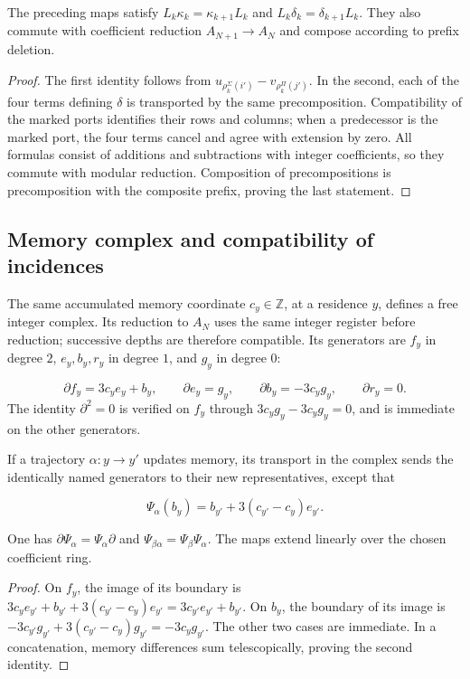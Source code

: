 \begin{proposition}
\label{iv:rectangular-natural}
The preceding maps satisfy
\(L_k\kappa_k=\kappa_{k+1}L_k\) and
\(L_k\delta_k=\delta_{k+1}L_k\).
They also commute with coefficient reduction
\(A_{N+1}\to A_N\) and compose according to prefix deletion.
\end{proposition}
\begin{proof}
The first identity follows from
\(u_{\rho_k^\Sigma(i')}-v_{\rho_k^\Pi(j')}\).
In the second, each of the four terms defining \(\delta\)
is transported by the same precomposition. Compatibility of the
marked ports identifies their rows and columns; when a predecessor is
the marked port, the four terms cancel and agree with
extension by zero. All formulas consist of additions and subtractions with
integer coefficients, so they commute with modular reduction.
Composition of precompositions is precomposition with the
composite prefix, proving the last statement.
\end{proof}

\subsection{Memory complex and compatibility of incidences}
\label{iv:cont:memoria}
The same accumulated memory coordinate \(c_y\in\mathbb Z\), at a residence \(y\), defines a free integer complex. Its reduction to \(A_N\) uses the same integer register before reduction; successive depths are therefore compatible. Its generators are \(f_y\) in degree \(2\), \(e_y,b_y,r_y\) in degree \(1\), and \(g_y\) in degree \(0\):

\[
\partial f_y=3c_y e_y+b_y,\qquad
\partial e_y=g_y,\qquad
\partial b_y=-3c_y g_y,\qquad
\partial r_y=0.
\]
The identity \(\partial^2=0\) is verified on \(f_y\) through \(3c_yg_y-3c_yg_y=0\), and is immediate on the other generators.

If a trajectory \(\alpha:y\to y'\) updates memory, its transport in the complex sends the identically named generators to their new representatives, except that

\[
\Psi_\alpha(b_y)=b_{y'}+3(c_{y'}-c_y)e_{y'}.
\]
\begin{proposition}
\label{iv:cont:memoria-natural}
One has \(\partial\Psi_\alpha=\Psi_\alpha\partial\) and \(\Psi_{\beta\alpha}=\Psi_\beta\Psi_\alpha\). The maps extend linearly over the chosen coefficient ring.

\end{proposition}
\begin{proof}
On \(f_y\), the image of its boundary is \(3c_ye_{y'}+b_{y'}+3(c_{y'}-c_y)e_{y'} =3c_{y'}e_{y'}+b_{y'}\). On \(b_y\), the boundary of its image is \(-3c_{y'}g_{y'}+3(c_{y'}-c_y)g_{y'}=-3c_yg_{y'}\). The other two cases are immediate. In a concatenation, memory differences sum telescopically, proving the second identity.
\end{proof}

